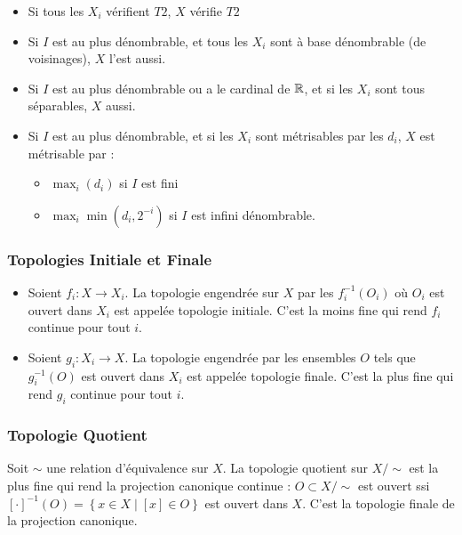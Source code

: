 \documentclass{cours}
\begin{document}
\begin{proposition}
    \begin{itemize}
        \item Si tous les $X_{i}$ vérifient $T2$, $X$ vérifie $T2$
        \item Si $I$ est au plus dénombrable, et tous les $X_{i}$ sont à base dénombrable (de voisinages), $X$ l'est aussi.
        \item Si $I$ est au plus dénombrable ou a le cardinal de $\mathbb{R}$, et si les $X_{i}$ sont tous séparables, $X$ aussi.
        \item Si $I$ est au plus dénombrable, et si les $X_{i}$ sont métrisables par les $d_{i}$, $X$ est métrisable par :
              \begin{itemize}
                  \item $\max_{i}(d_{i})$ si $I$ est fini
                  \item $\max_{i}\min(d_{i}, 2^{-i})$ si $I$ est infini dénombrable.
              \end{itemize}
    \end{itemize}

\end{proposition}

\subsubsection{Topologies Initiale et Finale}
\begin{definition}
    \begin{itemize}
        \item Soient $f_{i} : X \rightarrow X_{i}$. La topologie engendrée sur $X$ par les $f_{i}^{-1}(O_{i})$ où $O_{i}$ est ouvert dans $X_{i}$ est appelée topologie initiale. C'est la moins fine qui rend $f_{i}$ continue pour tout $i$.
        \item Soient $g_{i} : X_{i} \rightarrow X$. La topologie engendrée par les ensembles $O$ tels que $g_{i}^{-1}(O)$ est ouvert dans $X_{i}$ est appelée topologie finale. C'est la plus fine qui rend $g_{i}$ continue pour tout $i$.
    \end{itemize}
\end{definition}

\subsubsection{Topologie Quotient}
\begin{definition}
    Soit $\sim$ une relation d'équivalence sur $X$. La topologie quotient sur $X/\sim$ est la plus fine qui rend la projection canonique continue : $O \subset X/\sim$ est ouvert ssi $\left[\cdot\right]^{-1}(O) = \left\{x \in X \mid \left[x\right] \in O\right\}$ est ouvert dans $X$. C'est la topologie finale de la projection canonique.
\end{definition}
\end{document}
